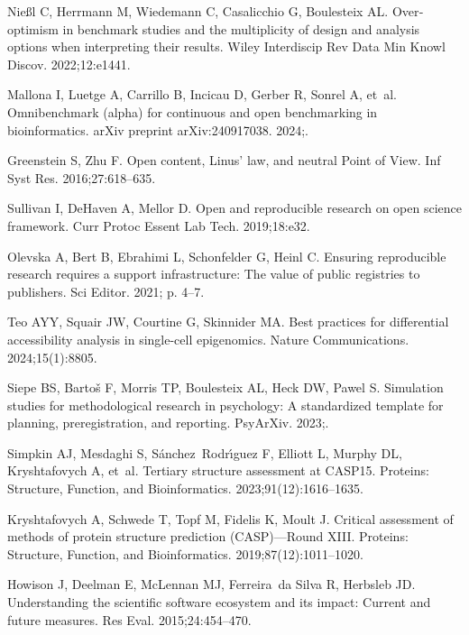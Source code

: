\documentclass[11pt]{article}
\begin{document}
\begin{thebibliography}{10}
Nießl C, Herrmann M, Wiedemann C, Casalicchio G, Boulesteix AL.
\newblock Over‐optimism in benchmark studies and the multiplicity of design
  and analysis options when interpreting their results.
\newblock Wiley Interdiscip Rev Data Min Knowl Discov. 2022;12:e1441.

Mallona I, Luetge A, Carrillo B, Incicau D, Gerber R, Sonrel A, et~al.
\newblock Omnibenchmark (alpha) for continuous and open benchmarking in
  bioinformatics.
\newblock arXiv preprint arXiv:240917038. 2024;.

Greenstein S, Zhu F.
\newblock Open content, Linus’ law, and neutral Point of View.
\newblock Inf Syst Res. 2016;27:618--635.

Sullivan I, DeHaven A, Mellor D.
\newblock Open and reproducible research on open science framework.
\newblock Curr Protoc Essent Lab Tech. 2019;18:e32.

Olevska A, Bert B, Ebrahimi L, Schonfelder G, Heinl C.
\newblock Ensuring reproducible research requires a support infrastructure: The
  value of public registries to publishers.
\newblock Sci Editor. 2021; p. 4--7.

Teo AYY, Squair JW, Courtine G, Skinnider MA.
\newblock Best practices for differential accessibility analysis in single-cell
  epigenomics.
\newblock Nature Communications. 2024;15(1):8805.

Siepe BS, Bartoš F, Morris TP, Boulesteix AL, Heck DW, Pawel S.
\newblock Simulation studies for methodological research in psychology: A
  standardized template for planning, preregistration, and reporting.
\newblock PsyArXiv. 2023;.

Simpkin AJ, Mesdaghi S, S{\'a}nchez~Rodr{\'\i}guez F, Elliott L, Murphy DL,
  Kryshtafovych A, et~al.
\newblock Tertiary structure assessment at CASP15.
\newblock Proteins: Structure, Function, and Bioinformatics.
  2023;91(12):1616--1635.

Kryshtafovych A, Schwede T, Topf M, Fidelis K, Moult J.
\newblock Critical assessment of methods of protein structure prediction
  (CASP)—Round XIII.
\newblock Proteins: Structure, Function, and Bioinformatics.
  2019;87(12):1011--1020.

Howison J, Deelman E, McLennan MJ, Ferreira~da Silva R, Herbsleb JD.
\newblock Understanding the scientific software ecosystem and its impact:
  Current and future measures.
\newblock Res Eval. 2015;24:454--470.


\end{thebibliography}
\end{document}
